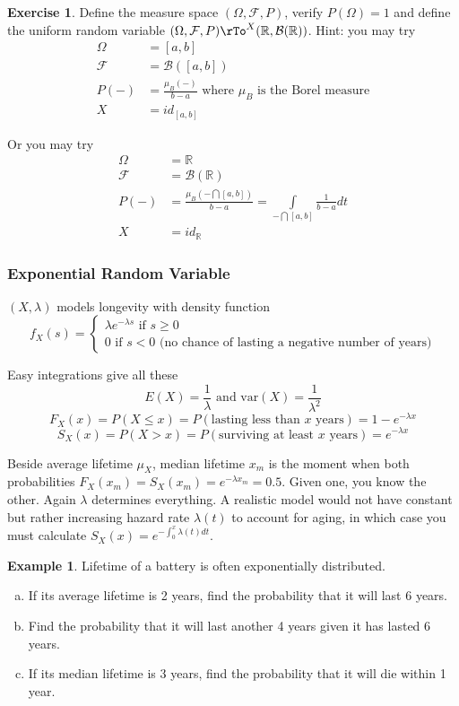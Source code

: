 \documentclass[12pt]{amsart}
\theoremstyle{definition}
\newtheorem{example}[theorem]{Example}
\newtheorem{exercise}[theorem]{Exercise}
\begin{document}
\begin{exercise} \label{define_uniform_random_variable} Define the measure space $(\Omega, \mathcal{F}, P)$, verify $P(\Omega) =1$ and define the uniform random variable $(\Omega, \mathcal{F}, P) \rTo^X (\mathbb{R}, \mathcal{B}(\mathbb{R}))$. Hint: you may try
\begin{align*}
\Omega & = [a, b] \\
\mathcal{F} & = \mathcal{B}([a, b]) \\
P(-) & = \frac{\mu_B(-)}{b-a} \text{ where } \mu_B \text{ is the Borel measure} \\
X & = id_{[a, b]}
\end{align*}

Or you may try
\begin{align*}
\Omega & = \mathbb{R} \\
\mathcal{F} & = \mathcal{B}(\mathbb{R}) \\
P(-) & = \frac{\mu_B(- \bigcap [a,b])}{b-a} = \int \limits_{- \bigcap [a,b]} \frac{1}{b-a}dt \\
X & = id_{\mathbb{R}}
\end{align*}
\end{exercise}

\subsubsection{Exponential Random Variable} $(X, \lambda)$ models longevity with density function
$$f_X(s) = \begin{cases} \lambda e^{-\lambda s} \text{ if } s \geq 0 \\ 0 \text{ if } s < 0 \text{ (no chance of lasting a negative number of years)} \end{cases}$$

Easy integrations give all these
$$E(X) = \frac{1}{\lambda} \text{ and } \text{var}(X) = \frac{1}{\lambda^2}$$
$$F_X(x) = P(X \leq x) = P(\text{lasting less than } x \text{ years}) = 1-e^{-\lambda x}$$
$$S_X(x) = P(X > x) = P(\text{surviving at least } x \text{ years}) = e^{-\lambda x}$$

Beside average lifetime $\mu_X$, median lifetime $x_{m}$ is the moment when both probabilities $F_X(x_m) =S_X(x_m) = e^{-\lambda x_{m}} = 0.5$. Given one, you know the other. Again
$\lambda$ determines everything. A realistic model would not have constant but rather increasing hazard rate $\lambda(t)$ to account for aging, in which case you must calculate $S_X(x)=e^{-\int_{0}^x\lambda(t) dt}$.
\begin{example} Lifetime of a battery is often exponentially distributed.
\begin{enumerate}[a.]
\item If its average lifetime is 2 years, find the probability that it will last 6 years.
\item Find the probability that it will last another 4 years given it has lasted 6 years.
\item If its median lifetime is 3 years, find the probability that it will die within 1 year.
\end{enumerate}
\end{example}
\end{document}
